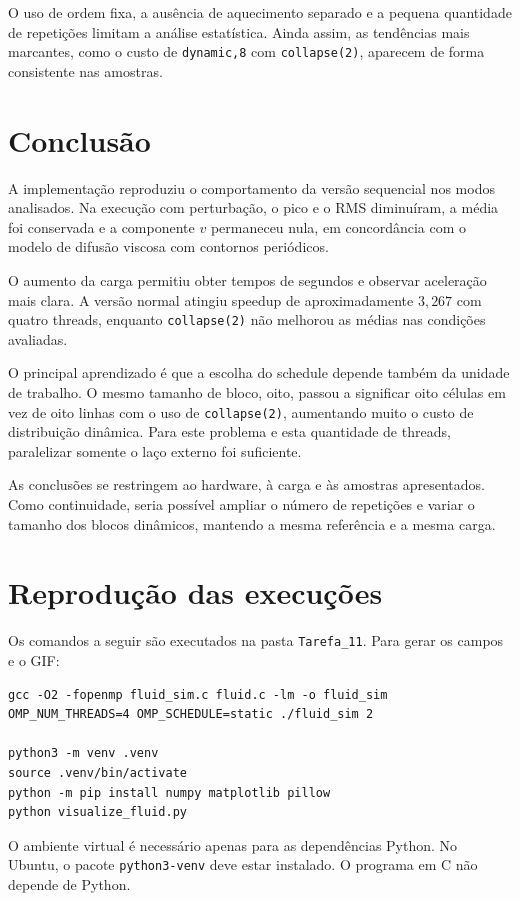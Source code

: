 \documentclass[12pt,a4paper]{article}
\begin{document}
O uso de ordem fixa, a ausência de aquecimento separado e a pequena quantidade de repetições limitam a análise estatística. Ainda assim, as tendências mais marcantes, como o custo de \texttt{dynamic,8} com \texttt{collapse(2)}, aparecem de forma consistente nas amostras.

\section{Conclusão}
A implementação reproduziu o comportamento da versão sequencial nos modos analisados. Na execução com perturbação, o pico e o RMS diminuíram, a média foi conservada e a componente $v$ permaneceu nula, em concordância com o modelo de difusão viscosa com contornos periódicos.

O aumento da carga permitiu obter tempos de segundos e observar aceleração mais clara. A versão normal atingiu speedup de aproximadamente $3{,}267$ com quatro threads, enquanto \texttt{collapse(2)} não melhorou as médias nas condições avaliadas.

O principal aprendizado é que a escolha do schedule depende também da unidade de trabalho. O mesmo tamanho de bloco, oito, passou a significar oito células em vez de oito linhas com o uso de \texttt{collapse(2)}, aumentando muito o custo de distribuição dinâmica. Para este problema e esta quantidade de threads, paralelizar somente o laço externo foi suficiente.

As conclusões se restringem ao hardware, à carga e às amostras apresentados. Como continuidade, seria possível ampliar o número de repetições e variar o tamanho dos blocos dinâmicos, mantendo a mesma referência e a mesma carga.

\appendix
\section{Reprodução das execuções}
Os comandos a seguir são executados na pasta \texttt{Tarefa\_11}. Para gerar os campos e o GIF:
\begin{lstlisting}[style=Terminal]
gcc -O2 -fopenmp fluid_sim.c fluid.c -lm -o fluid_sim
OMP_NUM_THREADS=4 OMP_SCHEDULE=static ./fluid_sim 2

python3 -m venv .venv
source .venv/bin/activate
python -m pip install numpy matplotlib pillow
python visualize_fluid.py
\end{lstlisting}
O ambiente virtual é necessário apenas para as dependências Python. No Ubuntu, o pacote \texttt{python3-venv} deve estar instalado. O programa em C não depende de Python.
\end{document}
